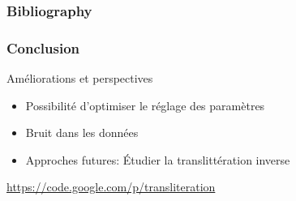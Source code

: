 \documentclass{beamer}
\begin{document}
\begin{frame}
    \frametitle{Bibliography}
    {\fontsize{0.8em}{1em}
    \nocite{*}
    
    }
\end{frame}

\begin{frame}
    \frametitle{Conclusion}
    \begin{block}{Améliorations et perspectives}
    \begin{itemize}
        \item Possibilité d'optimiser le réglage des paramètres
        \item Bruit dans les données
        \item Approches futures: Étudier la translittération inverse
    \end{itemize}
\end{block}
    \url{https://code.google.com/p/transliteration}
\end{frame}
\end{document}
